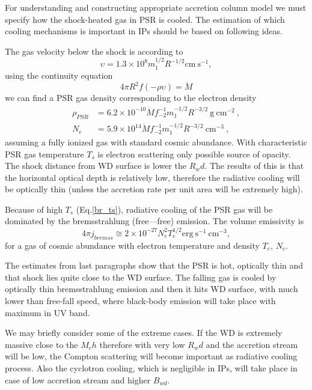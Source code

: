 \documentclass[oneside,a4paper,11pt]{report}
\begin{document}
For understanding and constructing appropriate accretion column model we must specify how the shock-heated 
gas in PSR is cooled. The estimation of which cooling mechanisms is important in IPs should be based on 
following ideas. 

The gas velocity below the shock is according to \cite{accpower:1} 
\begin{equation}
\upsilon = 1.3 \times 10^8 m_1^{1/2}R^{-1/2} \mathrm{cm \: s^{-1}}, 
\end{equation}
using the continuity equation 
\begin{equation}
 4\pi R^2 f(- \rho \upsilon) = \dot{M}
\end{equation}
we can find a PSR gas density corresponding to the electron density
\begin{equation}
 \label{gas_el_den_PSR}
\begin{split}
\rho_{PSR} &= 6.2 \times 10^{-10} \dot{M}f_{-2}^{-1}m_1^{-1/2}R^{-3/2} \: \mathrm{g \: cm^{-2}} \:, \\
N_e &= 5.9 \times 10^{14} \dot{M} f_{-2}^{-1}m_1^{-1/2}R^{-3/2} \: \mathrm{cm^{-3}} \:, 
\end{split}
\end{equation}
assuming a fully ionized gas with standard cosmic abundance. 
With characteristic PSR gas temperature $T_s$ is electron scattering only possible source of opacity. 
The shock distance from WD surface is lower the $R_wd$. The results of this is that the horizontal optical 
depth is relatively low, therefore the radiative cooling will be optically thin (unless the accretion 
rate per unit area will be extremely high).   
  
Because of high $T_s$ (Eq.\eqref{br_ts}), radiative cooling of the PSR gas will be dominated by the 
bremsstrahlung (free—free) emission. The volume emissivity is
\begin{equation}
4\pi j_{bremss} \cong 2 \times 10^{-27} N_e^2 T_e^{1/2} \mathrm{erg \:s^{-1} \: cm^{-3}}, 
\end{equation}
for a gas of cosmic abundance with electron temperature and density $T_e$, $N_e$.  

The estimates from last paragraphs show that the PSR is hot, optically thin and that shock lies quite 
close to the WD surface. The falling gas is cooled by optically thin bremsstrahlung emission and then 
it hits WD surface, with much lower than free-fall speed, where black-body emission will take place 
with maximum in UV band.   

We may briefly consider some of the extreme cases. If the WD is extremely massive close to the $M_ch$ 
therefore with very low $R_wd$ and the accretion stream will be low, the Compton scattering will 
become important as radiative cooling process. Also the cyclotron cooling, which is negligible in 
IPs, will take place in case of low accretion stream and higher $B_{wd}$.   
\end{document}
